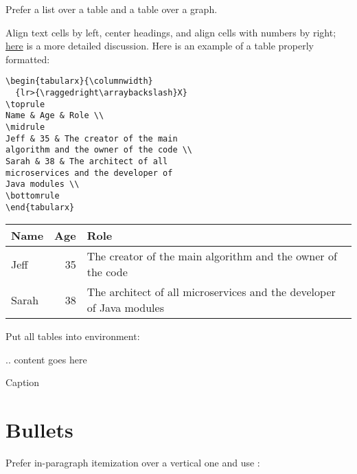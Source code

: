 \documentclass[12pt,nonacm,natbib=false]{acmart}
\begin{document}
Prefer a list over a table and a table over a graph.

Align text cells by left, center headings, and align cells with numbers by right; \href{https://ux.stackexchange.com/questions/24066/what-is-the-best-practice-for-data-table-cell-content-alignment}{here} is a more detailed discussion. Here is an example of a table properly formatted:

\begin{multicols}{2}
\setlength{\parskip}{0pt}
\small
\raggedcolumns
\begin{verbatim}
\begin{tabularx}{\columnwidth}
  {lr>{\raggedright\arraybackslash}X}
\toprule
Name & Age & Role \\
\midrule
Jeff & 35 & The creator of the main
algorithm and the owner of the code \\
Sarah & 38 & The architect of all
microservices and the developer of
Java modules \\
\bottomrule
\end{tabularx}
\end{verbatim}

\columnbreak

\begin{tabularx}{\columnwidth}
  {lr>{\raggedright\arraybackslash}X}
\toprule
Name & Age & Role \\
\midrule
Jeff & 35 & The creator of the main algorithm and the owner of the code \\
Sarah & 38 & The architect of all microservices and the developer of Java modules \\
\bottomrule
\end{tabularx}
\end{multicols}

Put all tables into  environment:

\begin{ffcode}
\begin{table}
.. content goes here
\caption{Caption}
\label{tab:my-table}
\end{table}
\end{ffcode}


\section{Bullets}

Prefer in-paragraph itemization over a vertical one and use \href{https://ctan.org/pkg/paralist}{}:
\end{document}
